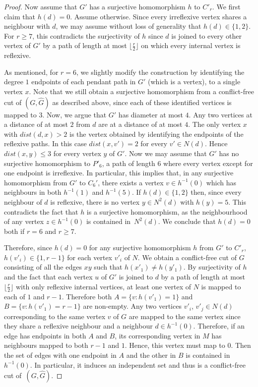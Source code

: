 \documentclass[a4paper,UKenglish,cleveref, autoref,thm-restate]{lipics-v2021}
\begin{document}
\begin{proof}
Now assume that $G'$ has a surjective homomorphism $h$ to $C'_r$. We first claim that $h(d)=0$. Assume otherwise. Since every irreflexive vertex shares a neighbour with $d$,  we may assume without loss of generality that $h(d) \in \{1,2 \}.$ For $r \geq 7$, this contradicts the surjectivity of $h$ since $d$ is joined to every other vertex of $G'$ by a path of length at most $\lfloor \frac{r}{2} \rfloor$ on which every internal vertex is reflexive.

As mentioned, for $r=6$, we slightly modify the construction by identifying the degree $1$ endpoints of each pendant path in $G'$ (which is a vertex), to a single vertex $x$. Note that we still obtain a surjective homomorphism from a conflict-free cut of $(G, \hat{G})$ as described above, since each of these identified vertices is mapped to $3$.  Now, we argue that $G'$ has diameter at most $4$. Any two vertices at a distance of at most $2$ from $d$ are at a distance of at most $4$. The only vertex $x$ with $dist(d,x)>2$ is the vertex obtained by identifying the endpoints of the reflexive paths. In this case $dist(x,v')=2$ for every $v' \in N(d)$. Hence $dist(x,y) \leq3$ for every vertex $y$ of $G'$. Now we may assume that $G'$ has no surjective homomorphism to $P'_6$, a path of length $6$ where every vertex except for one endpoint is irreflexive. In particular, this implies that, in any surjective homomorphism from $G'$ to $C_6'$, there exists a vertex  $v \in h^{-1}(0)$ which has neighbours in both $h^{-1}(1)$ and $h^{-1}(5)$. If $h(d) \in \{1,2\}$ then, since every neighbour of $d$ is reflexive, there is no vertex $y \in N^2(d)$ with $h(y)=5$. This contradicts the fact that $h$ is a surjective homomorphism, as the neighbourhood of any vertex $z \in h^{-1}(0)$ is contained in~$N^2(d)$. 
We conclude that $h(d)=0$ both if $r=6$ and $r\geq 7$.

Therefore, since $h(d)=0$ for any surjective homomorphism $h$ from $G'$ to $C'_r$, $h(v'_i) \in \{1, r-1 \}$ for each vertex $v'_i$ of $N$. We obtain a conflict-free cut of $G$ consisting of all the edges $xy$ such that $h(x'_1)\neq h(y'_1)$. By surjectivity of $h$ and the fact that each vertex $u$ of $G'$ is joined to $d$ by a path of length at most $\lfloor {\frac{r}{2}} \rfloor$ with only reflexive internal vertices, at least one vertex of $N$ is mapped to each of $1$ and $r-1$. Therefore both $A= \{v: h(v'_1)=1\}$ and $B= \{v: h(v'_1)=r-1 \}$ are non-empty. Any two vertices  $v'_i$,  $v'_j \in N(d)$ corresponding to the same vertex $v$ of $G$ are mapped to the same vertex since they share a reflexive neighbour and a neighbour $d \in h^{-1}(0)$. Therefore, if an edge has endpoints in both $A$ and $B$, its corresponding vertex in $M$ has neighbours mapped to both $r-1$ and $1$. Hence, this vertex must map to $0$. Then the set of edges with one endpoint in $A$ and the other in $B$ is contained in $h^{-1}(0)$. In particular, it induces an independent set and thus is a conflict-free cut of~$(G,\hat{G})$. 


\end{proof}
\end{document}
